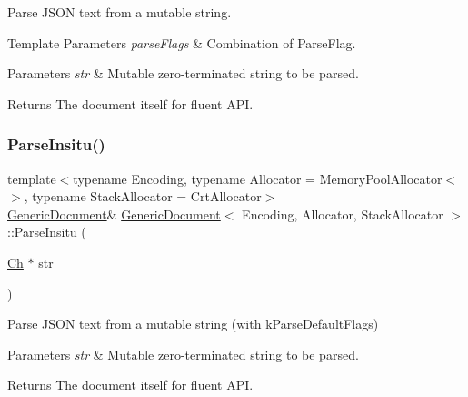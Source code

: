 Parse J\+S\+ON text from a mutable string. 


\begin{DoxyTemplParams}{Template Parameters}
{\em parse\+Flags} & Combination of Parse\+Flag. \\
\hline
\end{DoxyTemplParams}

\begin{DoxyParams}{Parameters}
{\em str} & Mutable zero-\/terminated string to be parsed. \\
\hline
\end{DoxyParams}
\begin{DoxyReturn}{Returns}
The document itself for fluent A\+PI. 
\end{DoxyReturn}
\mbox{\label{classGenericDocument_a81922881357539d5482d31aea14b5664}} 
\subsubsection{\texorpdfstring{Parse\+Insitu()}{ParseInsitu()}\hspace{0.1cm}{\footnotesize\ttfamily [2/4]}}
{\footnotesize\ttfamily template$<$typename Encoding, typename Allocator = Memory\+Pool\+Allocator$<$$>$, typename Stack\+Allocator = Crt\+Allocator$>$ \\
\hyperlink{classGenericDocument}{Generic\+Document}\& \hyperlink{classGenericDocument}{Generic\+Document}$<$ Encoding, Allocator, Stack\+Allocator $>$\+::Parse\+Insitu (\begin{DoxyParamCaption}\item[{\hyperlink{classGenericValue_ade0e0ce64ccd5d852da57a35e720bafb}{Ch} $\ast$}]{str }\end{DoxyParamCaption})\hspace{0.3cm}{\ttfamily [inline]}}



Parse J\+S\+ON text from a mutable string (with k\+Parse\+Default\+Flags) 


\begin{DoxyParams}{Parameters}
{\em str} & Mutable zero-\/terminated string to be parsed. \\
\hline
\end{DoxyParams}
\begin{DoxyReturn}{Returns}
The document itself for fluent A\+PI. 
\end{DoxyReturn}
\mbox{\label{classGenericDocument_a301f8f297a5a0da4b6be5459ad766f75}} 
